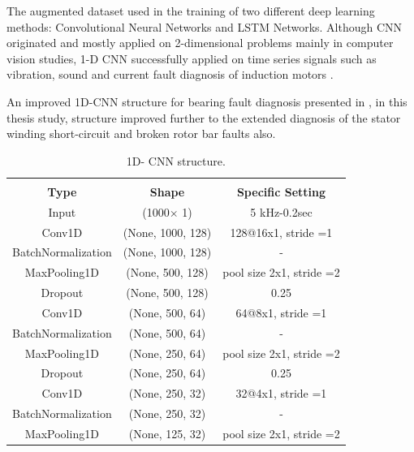 The augmented dataset used in the training of two different deep learning methods: Convolutional Neural Networks and LSTM Networks. Although CNN originated and mostly applied on 2-dimensional problems mainly in computer vision studies, 1-D CNN successfully applied on time series signals such as vibration, sound and current fault diagnosis of induction motors \cite{eren2017bearing,eren2019generic,qiao2020deep,skowron2020convolutional}.

An improved 1D-CNN structure for bearing fault diagnosis presented in \cite{chen2021improved}, in this thesis study, structure improved further to the extended diagnosis of the stator winding short-circuit and broken rotor bar faults also.

\begin{table}[h]
	{\setlength{\tabcolsep}{12pt}
 		\caption{1D- CNN structure.}
 		\begin{center}
 			\vspace{-6mm}
			\begin{tabular}{ccc}
				\hline \\[-2.45ex] \hline \\[-2.1ex]
			\textbf{Type}               & \textbf{Shape}             & \textbf{Specific Setting} \\
				\hline	
			Input              & (1000$\times$ 1)   & 5 kHz-0.2sec             \\				
			Conv1D             & (None, 1000, 128) & 128@16x1, stride =1      \\
			BatchNormalization & (None, 1000, 128) & -                        \\
			MaxPooling1D       & (None, 500, 128)  & pool size 2x1, stride =2 \\
			Dropout            & (None, 500, 128)  & 0.25                     \\
			Conv1D             & (None, 500, 64)   & 64@8x1, stride =1        \\
			BatchNormalization & (None, 500, 64)   & -                        \\
			MaxPooling1D       & (None, 250, 64)   & pool size 2x1, stride =2 \\
			Dropout            & (None, 250, 64)   & 0.25                     \\
			Conv1D             & (None, 250, 32)   & 32@4x1, stride =1        \\
			BatchNormalization & (None, 250, 32)   & -                        \\
			MaxPooling1D       & (None, 125, 32)   & pool size 2x1, stride =2 \\

\end{tabular}
\end{center}}
\end{table}
